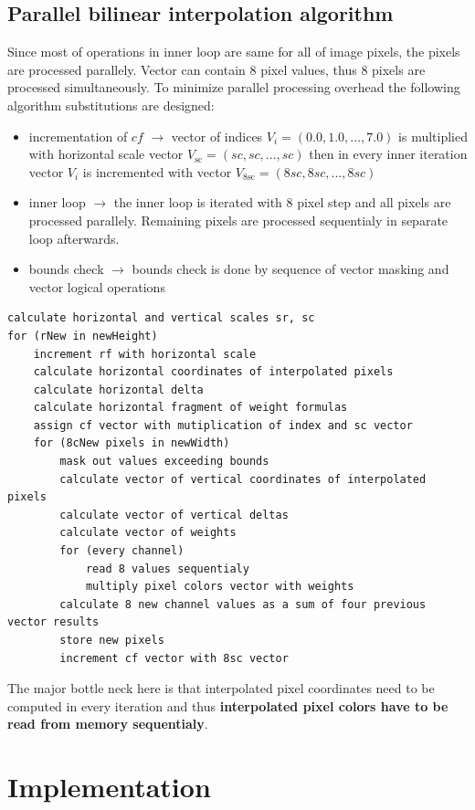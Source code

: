 \documentclass{article}
\begin{document}
\subsection{Parallel bilinear interpolation algorithm}
Since most of operations in inner loop are same for all of image pixels, the pixels are processed
parallely. Vector can contain 8 pixel values, thus 8 pixels are processed simultaneously. To minimize
parallel processing overhead the following algorithm substitutions are designed:
\begin{itemize}
    \item incrementation of $cf$ $\rightarrow$ vector of indices $V_i = (0.0, 1.0, ..., 7.0)$ is
            multiplied with horizontal scale vector $V_{\text{sc}} = (sc, sc, ..., sc)$ then in
            every inner iteration vector $V_i$ is incremented with vector
            $V_{\text{8sc}} = (8sc, 8sc, ..., 8sc)$
    \item inner loop $\rightarrow$ the inner loop is iterated with 8 pixel step and all pixels are
            processed parallely. Remaining pixels are processed sequentialy in separate loop
            afterwards.
    \item bounds check $\rightarrow$ bounds check is done by sequence of vector masking and vector
            logical operations
\end{itemize}
\begin{lstlisting}
calculate horizontal and vertical scales sr, sc
for (rNew in newHeight)
    increment rf with horizontal scale
    calculate horizontal coordinates of interpolated pixels
    calculate horizontal delta
    calculate horizontal fragment of weight formulas
    assign cf vector with mutiplication of index and sc vector
    for (8cNew pixels in newWidth)
        mask out values exceeding bounds
        calculate vector of vertical coordinates of interpolated pixels
        calculate vector of vertical deltas
        calculate vector of weights
        for (every channel)
            read 8 values sequentialy
            multiply pixel colors vector with weights
        calculate 8 new channel values as a sum of four previous vector results
        store new pixels
        increment cf vector with 8sc vector
\end{lstlisting}
The major bottle neck here is that interpolated pixel coordinates need to be computed in every
iteration and thus \textbf{interpolated pixel colors have to be read from memory sequentialy}.
\newpage
\section{Implementation}
\end{document}
